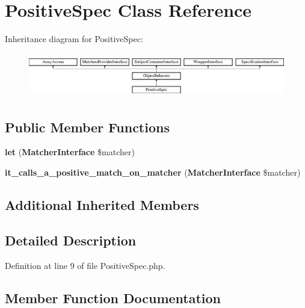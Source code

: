 \section{Positive\+Spec Class Reference}
\label{classspec_1_1_php_spec_1_1_wrapper_1_1_subject_1_1_expectation_1_1_positive_spec}
Inheritance diagram for Positive\+Spec\+:\begin{figure}[H]
\begin{center}
\leavevmode
\includegraphics[height=1.953488cm]{classspec_1_1_php_spec_1_1_wrapper_1_1_subject_1_1_expectation_1_1_positive_spec}
\end{center}
\end{figure}
\subsection*{Public Member Functions}
\begin{DoxyCompactItemize}
\item 
{\bf let} ({\bf Matcher\+Interface} \$matcher)
\item 
{\bf it\+\_\+calls\+\_\+a\+\_\+positive\+\_\+match\+\_\+on\+\_\+matcher} ({\bf Matcher\+Interface} \$matcher)
\end{DoxyCompactItemize}
\subsection*{Additional Inherited Members}


\subsection{Detailed Description}


Definition at line 9 of file Positive\+Spec.\+php.



\subsection{Member Function Documentation}
